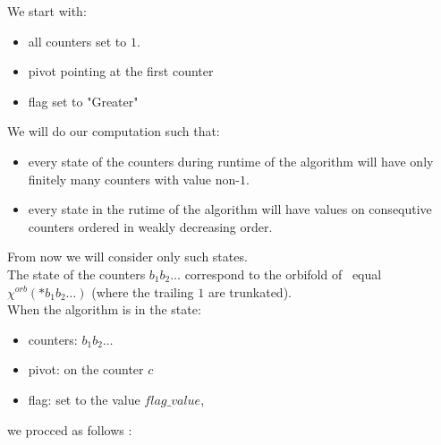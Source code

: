 We start with:
\begin{itemize}
\item all counters set to $1$. 
\item pivot pointing at the first counter
\item flag set to "Greater"
\end{itemize}
We will do our computation such that:
\begin{itemize}
\item every state of the counters during runtime of the algorithm will have only finitely many 
counters with value non-$1$. 
\item every state in the rutime of the algorithm 
will have values on consequtive counters ordered in weakly decreasing order.
\end{itemize}
From now we will 
consider only such states. \\
The state of the counters $b_1b_2\dots$ correspond to the orbifold of 
\Eoc\ equal $\chi^{orb}(*b_1b_2\dots)$ (where the trailing $1$ are trunkated). \\ 
When the algorithm is in the state: 
\begin{itemize}
\item counters: $b_1b_2\dots$
\item pivot: on the counter $c$
\item flag: set to the value $flag\_value$,
\end{itemize}
we procced as follows 
:
